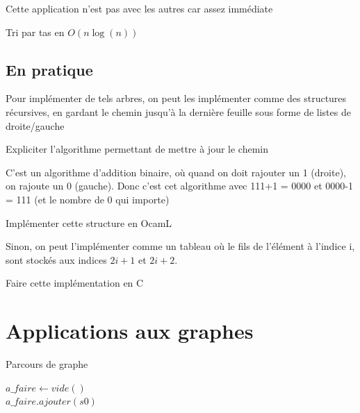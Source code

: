 \begin{com}
	Cette application n'est pas avec les autres car assez immédiate
\end{com}

\begin{appl}
	Tri par tas en $O(n \log(n))$
\end{appl}

\subsection{En pratique}

\begin{idee} 
	Pour implémenter de tels arbres, on peut les implémenter comme des structures récursives, en gardant le chemin jusqu'à la dernière feuille sous forme de listes de droite/gauche
\end{idee}

\begin{exercise}
	Expliciter l'algorithme permettant de mettre à jour le chemin
\end{exercise}

\begin{com}
	C'est un algorithme d'addition binaire, où quand on doit rajouter un 1 (droite), on rajoute un 0 (gauche). Donc c'est cet algorithme avec 111+1 = 0000 et 0000-1 = 111 (et le nombre de 0 qui importe)
\end{com}

\begin{exercise}
	Implémenter cette structure en OcamL
\end{exercise}

\begin{idee}
	Sinon, on peut l'implémenter comme un tableau où le fils de l'élément à l'indice i, sont stockés aux indices $2i+1$ et $2i+2$.
\end{idee}

\begin{exercise}
	Faire cette implémentation en C
\end{exercise}

\section{Applications aux graphes}

\begin{algorithm}[H]
	\caption{Parcours de graphe}
	$a\_faire \gets vide()$ \\
	$a\_faire.ajouter(s0)$ \\
\end{algorithm}

